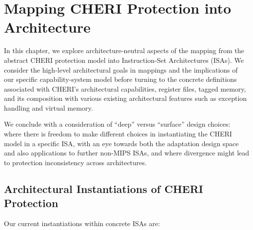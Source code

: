 \chapter{Mapping CHERI Protection into Architecture}
\label{chap:architecture}


In this chapter, we explore architecture-neutral aspects of the mapping from
the abstract CHERI protection model into Instruction-Set Architectures (ISAs).
We consider the high-level architectural goals in mappings and the
implications of our specific capability-system model before turning to the
concrete definitions associated with CHERI's architectural capabilities,
register files, tagged memory, and its composition with various existing
architectural features such as exception handling and virtual memory.

We conclude with a consideration of ``deep'' versus ``surface'' design
choices: where there is freedom to make different choices in instantiating
the CHERI model in a specific ISA, with an eye towards both the adaptation
design space and also applications to further non-MIPS ISAs, and where
divergence might lead to protection inconsistency across architectures.

\section{Architectural Instantiations of CHERI Protection}

Our current instantiations within concrete ISAs are:

